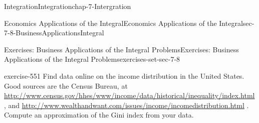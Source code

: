 \documentclass[oneside,10pt,]{book}
\numberwithin{equation}{section}
\begin{document}
\begin{chapterptx}{Integration}{}{Integration}{}{}{chap-7-Intergration}
\begin{sectionptx}{Economics Applications of the Integral}{}{Economics Applications of the Integral}{}{}{sec-7-8-BusinessApplicationsIntegral}
\begin{exercises-subsection-numberless}{Exercises: Business Applications of the Integral Problems}{}{Exercises: Business Applications of the Integral Problems}{}{}{exercises-set-sec-7-8}
\begin{divisionexercise}{14}{}{}{exercise-551}
Find data online on the income distribution in the United States.  Good sources are the Census Bureau, at \href{http://www.census.gov/hhes/www/income/data/historical/inequality/index.html}{http:\slash{}\slash{}www.census.gov\slash{}hhes\slash{}www\slash{}income\slash{}data\slash{}historical\slash{}inequality\slash{}index.html}, and \href{http://www.wealthandwant.com/issues/income/income_distribution.html}{http:\slash{}\slash{}www.wealthandwant.com\slash{}issues\slash{}income\slash{}income\textunderscore{}distribution.html} . Compute an approximation of the Gini index from your data.%
\end{divisionexercise}%
\end{exercises-subsection-numberless}
\end{sectionptx}
\end{chapterptx}
\end{document}
